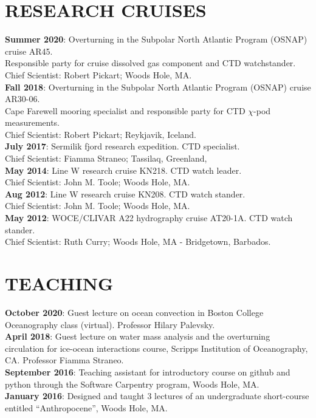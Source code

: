 \documentclass[paper=letter,fontsize=11pt]{scrartcl} %
\newcommand{\NewPart}[2]{\section*{\uppercase{#1} #2}}
\newcommand{\ShortEntry}[2]{\normalsize \noindent \textbf{#1}: #2 \\ }
\begin{document}
\NewPart{Research Cruises}{}

\ShortEntry{Summer 2020}{Overturning in the Subpolar North Atlantic Program (OSNAP) cruise AR45.\\ Responsible party for cruise dissolved gas component and CTD watchstander.\\ Chief Scientist: Robert Pickart; Woods Hole, MA.}

\ShortEntry{Fall 2018}{Overturning in the Subpolar North Atlantic Program (OSNAP) cruise AR30-06.\\ Cape Farewell mooring specialist and responsible party for CTD $\chi$-pod measurements.\\ Chief Scientist: Robert Pickart; Reykjavik, Iceland.}

\ShortEntry{July 2017}{Sermilik fjord research expedition. CTD specialist.\\ Chief Scientist: Fiamma Straneo; Tassilaq, Greenland,}

\ShortEntry{May 2014}{Line W research cruise KN218. CTD watch leader.\\ Chief Scientist: John M. Toole; Woods Hole, MA.}

\ShortEntry{Aug 2012}{Line W research cruise KN208. CTD watch stander.\\ Chief Scientist: John M. Toole; Woods Hole, MA.}

\ShortEntry{May 2012}{WOCE/CLIVAR A22 hydrography cruise AT20-1A. CTD watch stander.\\ Chief Scientist: Ruth Curry; Woods Hole, MA - Bridgetown, Barbados.}


\NewPart{Teaching}{}

\ShortEntry{October 2020}{Guest lecture on ocean convection in Boston College Oceanography class (virtual). Professor Hilary Palevsky.}

\ShortEntry{April 2018}{Guest lecture on water mass analysis and the overturning circulation for ice-ocean interactions course, Scripps Institution of Oceanography, CA. Professor Fiamma Straneo.}

\ShortEntry{September 2016}{Teaching assistant for introductory course on github and python through the Software Carpentry program, Woods Hole, MA.}

\ShortEntry{January 2016}{Designed and taught 3 lectures of an undergraduate short-course entitled ``Anthropocene'', Woods Hole, MA.}
\end{document}
